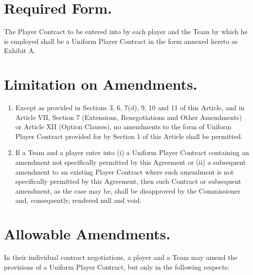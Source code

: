 \documentclass[
]{book}
\providecommand{\tightlist}{%
  \setlength{\itemsep}{0pt}\setlength{\parskip}{0pt}}
\begin{document}
\hypertarget{required-form.}{%
\section{Required Form.}\label{required-form.}}

The Player Contract to be entered into by each player and the Team by which he is employed shall be a Uniform Player Contract in the form annexed hereto as Exhibit A.

\hypertarget{limitation-on-amendments.}{%
\section{Limitation on Amendments.}\label{limitation-on-amendments.}}

\begin{enumerate}
\def\labelenumi{(\alph{enumi})}
\tightlist
\item
  Except as provided in Sections 3, 6, 7(d), 9, 10 and 11 of this Article, and in Article VII, Section 7 (Extensions, Renegotiations and Other Amendments) or Article XII (Option Clauses), no amendments to the form of Uniform Player Contract provided for by Section 1 of this Article shall be permitted.
\item
  If a Team and a player enter into (i) a Uniform Player Contract containing an amendment not specifically permitted by this Agreement or (ii) a subsequent amendment to an existing Player Contract where such amendment is not specifically permitted by this Agreement, then such Contract or subsequent amendment, as the case may be, shall be disapproved by the Commissioner and, consequently, rendered null and void.
\end{enumerate}

\hypertarget{allowable-amendments.}{%
\section{Allowable Amendments.}\label{allowable-amendments.}}

In their individual contract negotiations, a player and a Team may amend the provisions of a Uniform Player Contract, but only in the following respects:
\end{document}

